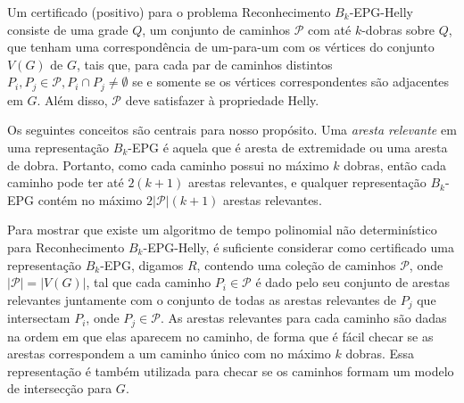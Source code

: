 Um certificado (positivo) para o problema {\sc Reconhecimento $B_k$-EPG-Helly} consiste de uma grade $Q$, um conjunto de caminhos $\mathcal{P}$ com até $k$-dobras sobre $Q$, que tenham uma correspondência de um-para-um com os vértices do conjunto $V(G)$ de $G$, tais que, para cada par de caminhos distintos $P_i, P_j\in \mathcal{P}, P_i\cap P_j \neq \emptyset $  se e somente se os vértices correspondentes são adjacentes em $G$. Além disso, $\mathcal{P}$ deve satisfazer à propriedade Helly.

Os seguintes conceitos são centrais para nosso propósito.
Uma \emph{aresta relevante} em uma representação $B_k$-EPG é aquela que é aresta de extremidade ou uma aresta de dobra. Portanto, como cada caminho possui no máximo $k$ dobras, então cada caminho pode ter até $2(k+1)$ arestas relevantes, e qualquer representação $B_k$-EPG contém no máximo $2|\mathcal{P}|(k+1)$ arestas relevantes.




Para mostrar que existe um algoritmo de tempo polinomial não determinístico para {\sc Reconhecimento $B_k$-EPG-Helly}, é suficiente considerar como certificado uma representação $B_k$-EPG, digamos  $R$, contendo uma coleção de caminhos  $\mathcal{P}$, onde $|\mathcal{P}| = |V(G)|$, tal que cada caminho   $P_i \in \mathcal{P}$  é dado pelo seu conjunto de arestas relevantes juntamente com o conjunto de todas as arestas relevantes de $P_j$ que intersectam $P_i$, onde $P_j \in \mathcal{P}$.  %
 As arestas relevantes para cada caminho são dadas na ordem em que elas aparecem no caminho, de forma que é fácil checar se as arestas correspondem a um caminho único com no máximo  $k$ dobras. Essa representação é também utilizada para checar se os caminhos formam um modelo de intersecção para  $G$.

